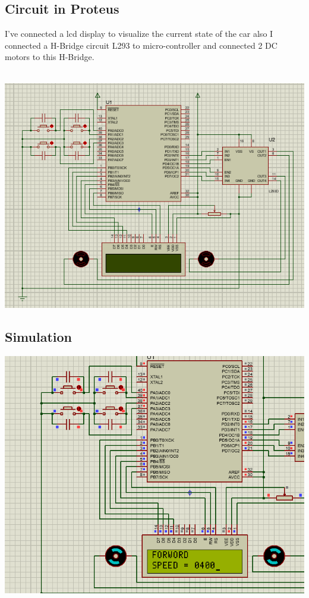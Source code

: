 \subsection{Circuit in Proteus}
I've connected a lcd display to visualize the current state of the car also I connected a H-Bridge circuit L293 to micro-controller and connected 2 DC motors to this H-Bridge.\\\\
\centerline{
	\includegraphics[width=1.0\textwidth]{solution/images/schematics.png}
}

\subsection{Simulation}
\centerline{
	\includegraphics[width=1.0\textwidth]{solution/images/result.png}
}

